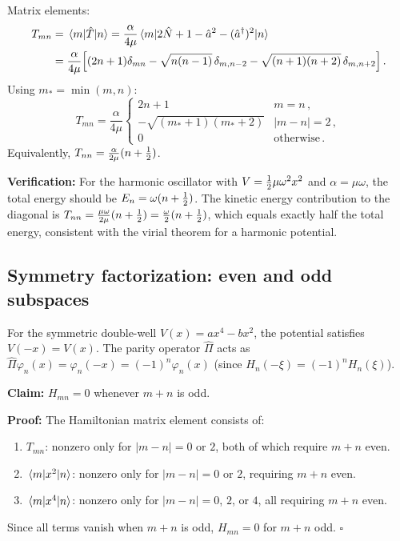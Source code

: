 Matrix elements:
\begin{align}
  T_{mn} &= \mel{m}{\hat{T}}{n}
  = \frac{\alpha}{4\mu}\mel{m}{2\hat{N}+1-\hat{a}^2-(\hat{a}^{\dagger})^2}{n}\notag\\
  &= \frac{\alpha}{4\mu}\Bigl[(2n+1)\delta_{mn} - \sqrt{n(n-1)}\,\delta_{m,n-2} - \sqrt{(n+1)(n+2)}\,\delta_{m,n+2}\Bigr]\,.
\end{align}
Using $m_* = \min(m,n)$:
\begin{equation}\label{eq:T_HO}
  \boxed{T_{mn} = \frac{\alpha}{4\mu}
  \begin{cases}
    2n + 1 & m = n\,,\\[4pt]
    -\sqrt{(m_*+1)(m_*+2)} & |m-n| = 2\,,\\[4pt]
    0 & \text{otherwise}\,.
  \end{cases}}
\end{equation}
Equivalently, $T_{nn} = \frac{\alpha}{2\mu}(n+\tfrac{1}{2})$.

\textbf{Verification:} For the harmonic oscillator with $V = \tfrac{1}{2}\mu\omega^2 x^2$
and $\alpha = \mu\omega$, the total energy should be $E_n = \omega(n+\tfrac{1}{2})$.
The kinetic energy contribution to the diagonal is $T_{nn} = \frac{\mu\omega}{2\mu}(n+\tfrac{1}{2})
= \frac{\omega}{2}(n+\tfrac{1}{2})$, which equals exactly half the total energy, consistent
with the virial theorem for a harmonic potential.

\subsection{Symmetry factorization: even and odd subspaces}\label{sec:parity}

For the symmetric double-well $V(x) = ax^4 - bx^2$, the potential satisfies $V(-x) = V(x)$.
The parity operator $\hat{\Pi}$ acts as $\hat{\Pi}\varphi_n(x) = \varphi_n(-x) = (-1)^n\varphi_n(x)$
(since $H_n(-\xi) = (-1)^n H_n(\xi)$).

\textbf{Claim:} $H_{mn} = 0$ whenever $m + n$ is odd.

\textbf{Proof:} The Hamiltonian matrix element consists of:
\begin{enumerate}
  \item $T_{mn}$: nonzero only for $|m-n| = 0$ or $2$, both of which require $m+n$ even.
  \item $\mel{m}{x^2}{n}$: nonzero only for $|m-n| = 0$ or $2$, requiring $m+n$ even.
  \item $\mel{m}{x^4}{n}$: nonzero only for $|m-n| = 0$, $2$, or $4$, all requiring $m+n$ even.
\end{enumerate}
Since all terms vanish when $m+n$ is odd, $H_{mn} = 0$ for $m+n$ odd. $\square$

